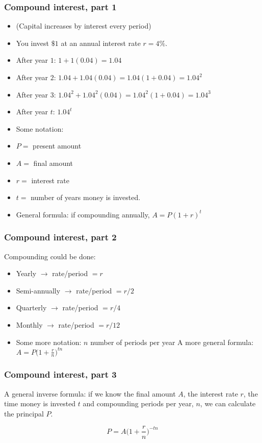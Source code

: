 \documentclass[xcolor=dvipsnames, 9pt]{beamer} %
\begin{document}
\begin{frame}
\frametitle{Compound interest, part 1}
\begin{itemize}
\item (Capital increases by interest every period)
\item You invest $\$1$ at an annual interest rate $r=4\%$. 
\item After year $1$: $1 + 1(0.04) = 1.04$
\item After year $2$: $1.04 + 1.04(0.04) = 1.04(1 + 0.04) = 1.04^2$
\item After year $3$: $1.04^2 + 1.04^2(0.04) = 1.04^2(1 + 0.04) = 1.04^3$
\item After year $t$: $1.04^t$
\item[] Some notation: 
\item $P=$ present amount
\item $A=$ final amount
\item $r =$ interest rate
\item $t=$ number of years money is invested. 
\item General formula: if compounding annually, \textcolor{dark_red}{$A = P(1 + r)^t$}
\end{itemize}

\end{frame}

\begin{frame}
\frametitle{Compound interest, part 2}
Compounding could be done: 

\begin{itemize}
\item Yearly $\rightarrow$ rate/period $=r$
\item Semi-annually $\rightarrow$ rate/period $=r/2$
\item Quarterly $\rightarrow$ rate/period $=r/4$
\item Monthly $\rightarrow$ rate/period $=r/12$
\item Some more notation: $n$ number of periods per year
A more general formula: \textcolor{dark_red}{$A = P\big(1 + \frac{r}{n}\big)^{tn}$}
\end{itemize}
\end{frame}

\begin{frame}
\frametitle{Compound interest, part 3}

A general \textcolor{dark_red}{inverse} formula: if we know the final amount $A$, the interest rate $r$, the time money is invested $t$ and compounding periods per year, $n$, we can calculate the principal $P$. 

\textcolor{dark_red}{$$ P = A \bigg(1 + \frac{r}{n}\bigg)^{-tn} $$}

\end{frame}
\end{document}
